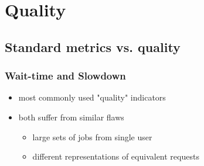 

\section{Quality}
\subsection{Standard metrics vs. quality}

\begin{frame}
	\frametitle{Wait-time and Slowdown}
	\begin{itemize}
		\item most commonly used "quality" indicators
		\item both suffer from similar flaws
		\begin{itemize}
			\item large sets of jobs from single user
			\item different representations of equivalent requests
		\end{itemize}
	\end{itemize}
\end{frame}

